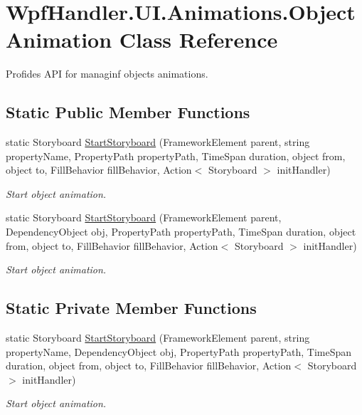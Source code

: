 \hypertarget{class_wpf_handler_1_1_u_i_1_1_animations_1_1_object_animation}{}\section{Wpf\+Handler.\+U\+I.\+Animations.\+Object\+Animation Class Reference}
\label{class_wpf_handler_1_1_u_i_1_1_animations_1_1_object_animation}


Profides A\+PI for managinf objects animations.  


\subsection*{Static Public Member Functions}
\begin{DoxyCompactItemize}
\item 
static Storyboard \mbox{\hyperlink{class_wpf_handler_1_1_u_i_1_1_animations_1_1_object_animation_ac96433e1be9908688f99df2ce31522cb}{Start\+Storyboard}} (Framework\+Element parent, string property\+Name, Property\+Path property\+Path, Time\+Span duration, object from, object to, Fill\+Behavior fill\+Behavior, Action$<$ Storyboard $>$ init\+Handler)
\begin{DoxyCompactList}\small\item\em Start object animation. \end{DoxyCompactList}\item 
static Storyboard \mbox{\hyperlink{class_wpf_handler_1_1_u_i_1_1_animations_1_1_object_animation_a15ee07796f01bd55b0fc64b328388365}{Start\+Storyboard}} (Framework\+Element parent, Dependency\+Object obj, Property\+Path property\+Path, Time\+Span duration, object from, object to, Fill\+Behavior fill\+Behavior, Action$<$ Storyboard $>$ init\+Handler)
\begin{DoxyCompactList}\small\item\em Start object animation. \end{DoxyCompactList}\end{DoxyCompactItemize}
\subsection*{Static Private Member Functions}
\begin{DoxyCompactItemize}
\item 
static Storyboard \mbox{\hyperlink{class_wpf_handler_1_1_u_i_1_1_animations_1_1_object_animation_ab4a73302bd6186812494d099f0b6c469}{Start\+Storyboard}} (Framework\+Element parent, string property\+Name, Dependency\+Object obj, Property\+Path property\+Path, Time\+Span duration, object from, object to, Fill\+Behavior fill\+Behavior, Action$<$ Storyboard $>$ init\+Handler)
\begin{DoxyCompactList}\small\item\em Start object animation. \end{DoxyCompactList}\end{DoxyCompactItemize}


